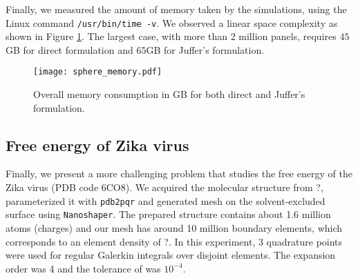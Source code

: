 Finally, we measured the amount of memory taken by the simulations, using the Linux command \texttt{/usr/bin/time -v}.
We observed a linear space complexity as shown in Figure \ref{fig:sphere_memory}.
The largest case, with more than $2$ million panels, requires $45$GB for direct formulation and $65$GB for Juffer's formulation.

\begin{figure}[htbp]
    \centering
    \texttt{[image: sphere\_memory.pdf]} 
    \caption{Overall memory consumption in GB for both direct and Juffer's formulation.}
    \label{fig:sphere_memory}
\end{figure}

\subsection{Free energy of Zika virus}

Finally, we present a more challenging problem that studies the free energy of the Zika virus (PDB code 6CO8).
We acquired the molecular structure from ?, parameterized it with \texttt{pdb2pqr} and generated mesh on the solvent-excluded surface using \texttt{Nanoshaper}.
The prepared structure contains about 1.6 million atoms (charges) and our mesh has around 10 million boundary elements, which corresponds to an element density of ?.
In this experiment, 3 quadrature points were used for regular Galerkin integrals over disjoint elements.
The \fmm expansion order was 4 and the tolerance of \gmres was $10^{-4}$.

